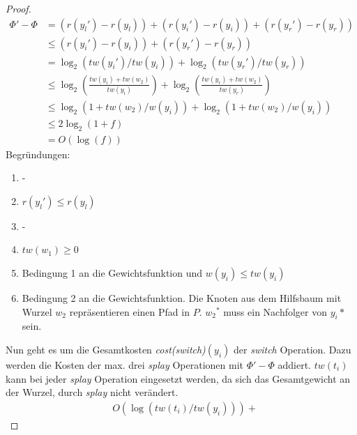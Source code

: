 \documentclass[a4paper,12pt]{article}
\begin{document}
\begin{proof}
\begin{align}
	\Phi' - \Phi &= \left( r\left({y_l}'\right) - r\left({y_l}\right)\right) + \left( r\left({y_i}'\right) - r\left({y_i}\right)\right) + \left( r\left({y_r}'\right) - r\left({y_r}\right)\right)\\
	&\leq   \left( r\left({y_i}'\right) - r\left({y_i}\right)\right) +  \left( r\left({y_r}'\right) - r\left({y_r}\right)\right)\\
	&=\log_2\left( \mathit{tw}\left({y_i}'\right)  / \mathit{tw}\left({y_i}\right)  \right) + \log_2\left( \mathit{tw}\left({y_r}'\right)  / \mathit{tw}\left({y_r}\right)  \right) \\
	&\leq	\log_2\left(\frac{\mathit{tw}\left({y_i}\right) + \mathit{tw}\left({w_2} \right)  }{\mathit{tw}\left({y_i}\right)}   \right) + \log_2\left( \frac{\mathit{tw}\left({y_r}\right) + \mathit{tw}\left({w_2} \right)}{\mathit{tw}\left({y_r}\right)} 	  \right) \\
	&\leq \log_2\left( 1 + \mathit{tw}\left({w_2}  	\right) / \mathit{w}\left({y_i}\right) \right)  +
	\log_2 \left(1 + \mathit{tw}\left({w_2}   	\right) / \mathit{w}\left({y_i}\right) \right)  \\
	&\leq 2 \log_2 \left(1 + f\right)\\
	&= O\left(\log \left(f\right)\right)
\end{align}
Begründungen:
\begin{enumerate}
	\item -
	\item $ r\left({y_l}'\right) \leq r\left({y_l}\right)$
	\item -
	\item $\mathit{tw}\left({w_1}\right) \geq 0$
	\item Bedingung 1 an die Gewichtsfunktion und $w\left(y_i\right) \leq \mathit{tw}\left(y_i\right)$
	\item Bedingung 2 an die Gewichtsfunktion. Die Knoten aus dem Hilfsbaum mit Wurzel $w_2$ repräsentieren einen Pfad in $P$. ${w_2}^*$ muss ein Nachfolger von ${y_i}*$ sein.
\end{enumerate}	
Nun geht es um die Gesamtkosten \textit{cost(switch)}$\left(y_i\right)$ der \textit{switch} Operation. Dazu werden die Kosten der max. drei \textit{splay} Operationen mit $\Phi' - \Phi$ addiert. $\mathit{tw}\left(t_i\right)$ kann bei jeder \textit{splay} Operation eingesetzt werden, da sich das Gesamtgewicht an der Wurzel, durch \textit{splay} nicht verändert.
\begin{align*}
&O\left(\log \left(\mathit{tw}\left(t_i\right) /  \mathit{tw}\left(y_i\right)  \right) \right) +

\end{align*}
\end{proof}
\end{document}
